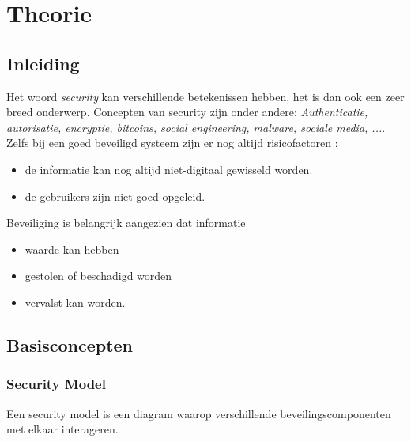 \documentclass{report}
\begin{document}
	\tableofcontents
	
	\part{Theorie}
	\chapter{Inleiding}
	Het woord \textit{security} kan verschillende betekenissen hebben, het is dan ook een zeer breed onderwerp. Concepten van security zijn onder andere: \textit{Authenticatie, autorisatie, encryptie, bitcoins, social engineering, malware, sociale media, ...}. Zelfs bij een goed beveiligd systeem zijn er nog altijd risicofactoren :
	\begin{itemize}
		\item de informatie kan nog altijd niet-digitaal gewisseld worden.
		\item de gebruikers zijn niet goed opgeleid.
	\end{itemize}
	Beveiliging is belangrijk aangezien dat informatie 
	\begin{itemize}
		\item waarde kan hebben
		\item gestolen of beschadigd worden
		\item vervalst kan worden.
	\end{itemize}
	\chapter{Basisconcepten}
	\section{Security Model}
	Een security model is een diagram waarop verschillende beveilingscomponenten met elkaar interageren.
\end{document}
